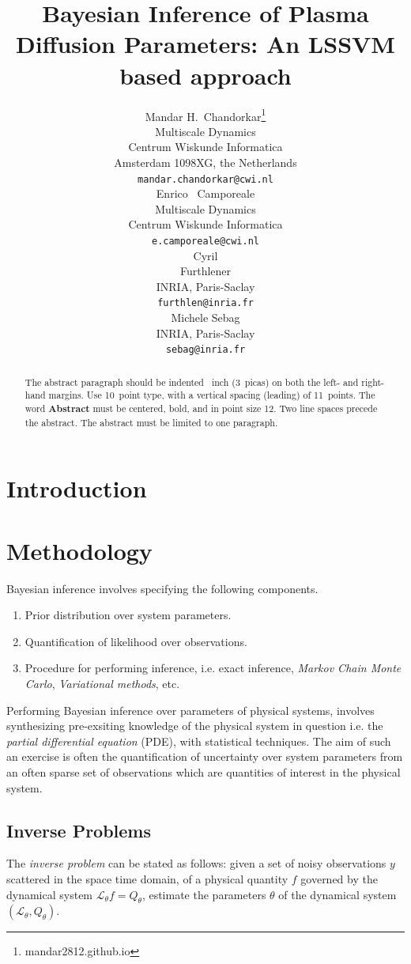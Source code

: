 \documentclass{article}
\title{Bayesian Inference of Plasma Diffusion Parameters: An LSSVM based approach}
\author{
  Mandar H.~Chandorkar\thanks{mandar2812.github.io} \\
  Multiscale Dynamics\\
  Centrum Wiskunde Informatica\\
  Amsterdam 1098XG, the Netherlands\\
  \texttt{mandar.chandorkar@cwi.nl} \\
   \And
   Enrico ~Camporeale \\
   Multiscale Dynamics \\
   Centrum Wiskunde Informatica \\
   \texttt{e.camporeale@cwi.nl} \\
   \AND
   Cyril \\
   Furthlener \\
   INRIA, Paris-Saclay \\
   \texttt{furthlen@inria.fr} \\
   \And
   Michele Sebag \\
   INRIA, Paris-Saclay \\
   \texttt{sebag@inria.fr} \\
}
\begin{document}

\maketitle

\begin{abstract}
  The abstract paragraph should be indented ~inch
  (3~picas) on both the left- and right-hand margins. Use 10~point
  type, with a vertical spacing (leading) of 11~points.  The word
  \textbf{Abstract} must be centered, bold, and in point size 12. Two
  line spaces precede the abstract. The abstract must be limited to
  one paragraph.
\end{abstract}

\section{Introduction}

\section{Methodology}

Bayesian inference involves specifying the following components.
\begin{enumerate}
\item Prior distribution over system parameters.
\item Quantification of likelihood over observations.
\item Procedure for performing inference, i.e. exact inference, \emph{Markov Chain
    Monte Carlo}, \emph{Variational methods}, etc.
\end{enumerate}

Performing Bayesian inference over parameters of physical systems,
involves synthesizing pre-exsiting knowledge of the physical system in
question i.e. the \emph{partial differential equation} (PDE), with
statistical techniques. The aim of such an exercise is often the
quantification of uncertainty over system parameters from an often
sparse set of observations which are quantities of interest in the
physical system. 

\subsection{Inverse Problems}\label{sec:inv}

The \emph{inverse problem} can be stated as follows: given a set of
noisy observations $y$ scattered in the space time domain, of a
physical quantity $f$ governed by the dynamical system
$\mathcal{L}_{\theta} f = Q_{\theta}$, estimate the parameters $\theta$ of the
dynamical system $(\mathcal{L}_{\theta}, Q_{\theta})$.
\end{document}

